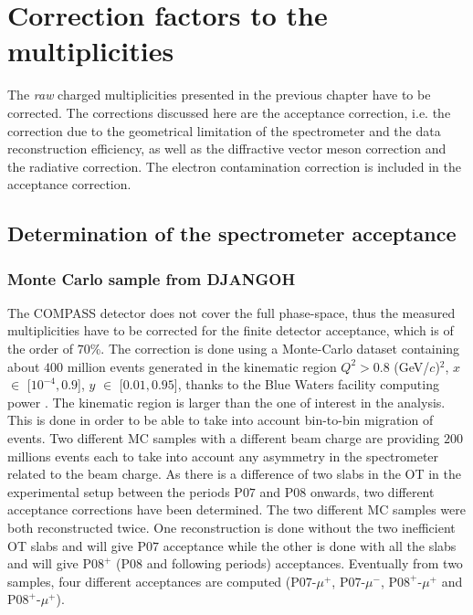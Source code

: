 
\chapter{Correction factors to the multiplicities} %

\label{ch:CF} %


The \textit{raw} charged multiplicities presented in the previous chapter have to be corrected. The corrections discussed here are the acceptance correction, i.e. the correction due to the geometrical limitation of the spectrometer and the data reconstruction efficiency, as well as the diffractive vector meson correction and the radiative correction. The electron contamination correction is included in the acceptance correction.

\section{Determination of the spectrometer acceptance} \label{sec:Acc}

\subsection{Monte Carlo sample from DJANGOH}

The COMPASS detector does not cover the full phase-space, thus the measured multiplicities have to be corrected for the finite detector acceptance, which is of the order of $70$\%. The correction is done using a Monte-Carlo dataset containing about $400$ million events generated in the kinematic region $Q^2 > 0.8$ (GeV/$c$)$^2$, $x$ $\in$ [$10^{-4},0.9$], $y$ $\in$ [$0.01,0.95$], thanks to the Blue Waters facility computing power \cite{Bode2013,Kramer2015}. The kinematic region is larger than the one of interest in the analysis. This is done in order to be able to take into account bin-to-bin migration of events. Two different MC samples with a different beam charge are providing $200$ millions events each to take into account any asymmetry in the spectrometer related to the beam charge. As there is a difference of two slabs in the OT in the experimental setup between the periods P$07$ and P$08$ onwards, two different acceptance corrections have been determined. The two different MC samples were both reconstructed twice. One reconstruction is done without the two inefficient OT slabs and will give P$07$ acceptance while the other is done with all the slabs and will give P$08^+$ (P08 and following periods) acceptances. Eventually from two samples, four different acceptances are computed (P$07$-$\mu^+$, P$07$-$\mu^-$, P$08^+$-$\mu^+$ and P$08^+$-$\mu^+$).


